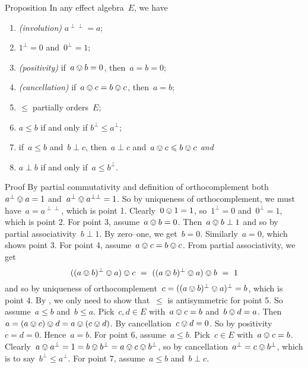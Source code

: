 \documentclass[b]{subfiles}
\begin{document}
\begin{parsec}
\begin{point}{Proposition}%
In any effect algebra~$E$, we have
\begin{enumerate}
    \item \emph{(involution)}
        $a^{\perp\perp} = a$;
    \item
        $1^\perp= 0$ and~$0^\perp = 1$;
    \item \emph{(positivity)}
        if~$a\ovee b = 0$, then~$a = b= 0$;
    \item \emph{(cancellation)}
        if~$a\ovee c = b\ovee c$, then~$a = b$;
    \item $\leq$ partially orders~$E$;
    \item $a \leq b$ if and only if $b^\perp \leq a^\perp$;
    \item if~$a \leq b$ and~$b \perp c$, then~$a \perp c$
        and~$a \ovee c \leq b \ovee c$ \emph{and}
    \item $a \perp b$ if and only if~$a \leq b^\perp$.
\end{enumerate}
\begin{point}{Proof}%
By partial commutativity and definition
of orthocomplement both~$a^\perp \ovee a = 1$
and~$a^\perp \ovee  a^{\perp\perp} = 1$.
So by uniqueness of orthocomplement,
    we must have~$a= a^{\perp\perp}$, which is point 1.
Clearly~$0 \ovee 1 = 1$,
    so~$1^\perp = 0$ and~$0^\perp = 1$,
    which is point 2.
For point 3, assume~$a \ovee b = 0$.
Then~$a \ovee b \perp 1$
    and so by partial associativity~$b \perp 1$.
    By zero--one, we get~$b = 0$.
    Similarly~$a=0$, which shows point 3.
For point 4, assume~$ a \ovee c = b \ovee c$.
From partial associativity, we get
\begin{equation*}
    ((a \ovee b)^\perp\ovee a) \ovee c \ =\  
    ((a \ovee b)^\perp\ovee a) \ovee b \ = \ 1
\end{equation*}
and so by uniqueness of
orthocomplement~$c = ((a\ovee b)^\perp\ovee a)^\perp = b$,
    which is point 4.
By ,
    we only need to show that~$\leq$ is antisymmetric
    for point 5.
So assume~$a \leq b$ and~$b \leq a$.
Pick~$c,d \in E$ with~$a \ovee c = b$ and~$b \ovee d = a$.
Then~$a = (a \ovee c) \ovee d = a \ovee (c \ovee d)$.
By cancellation~$c \ovee d = 0$.
So by positivity~$c = d= 0$.
Hence~$a = b$.
For point 6, assume~$a\leq b$.
Pick~$c \in E$ with~$a \ovee c = b$.
Clearly~$a \ovee a^\perp = 1 = b \ovee b^\perp = a \ovee c \ovee b^\perp$,
so by cancellation~$a^\perp = c \ovee b^\perp$,
    which is to say~$b^\perp \leq a^\perp$.
For point 7, assume~$a \leq b$ and~$b \perp c$.

\end{point}
\end{point}
\end{parsec}
\end{document}
